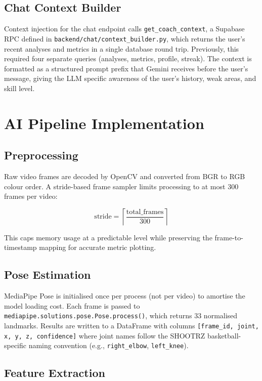 \subsection{Chat Context Builder}

Context injection for the chat endpoint calls \lstinline|get_coach_context|, a Supabase RPC defined in \lstinline|backend/chat/context_builder.py|, which returns the user's recent analyses and metrics in a single database round trip. Previously, this required four separate queries (analyses, metrics, profile, streak). The context is formatted as a structured prompt prefix that Gemini receives before the user's message, giving the LLM specific awareness of the user's history, weak areas, and skill level.

\section{AI Pipeline Implementation}
\label{sec:ai_pipeline}

\subsection{Preprocessing}

Raw video frames are decoded by OpenCV and converted from BGR to RGB colour order. A stride-based frame sampler limits processing to at most 300 frames per video:

\begin{equation}
  \text{stride} = \left\lceil \frac{\text{total\_frames}}{300} \right\rceil
\end{equation}

This caps memory usage at a predictable level while preserving the frame-to-timestamp mapping for accurate metric plotting.

\subsection{Pose Estimation}

MediaPipe Pose is initialised once per process (not per video) to amortise the model loading cost. Each frame is passed to \lstinline|mediapipe.solutions.pose.Pose.process()|, which returns 33 normalised landmarks. Results are written to a DataFrame with columns \lstinline|[frame_id, joint, x, y, z, confidence]| where joint names follow the SHOOTRZ basketball-specific naming convention (e.g., \lstinline|right_elbow|, \lstinline|left_knee|).

\subsection{Feature Extraction}

